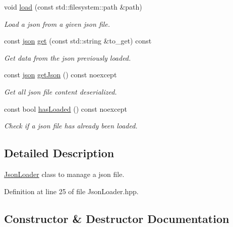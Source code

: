 \begin{DoxyCompactItemize}
void \hyperlink{classtls_1_1_json_loader_ad587735dbb8e8cfc5cd002a0aa9a7d7f}{load} (const std\+::filesystem\+::path \&path)
\begin{DoxyCompactList}\small\item\em Load a json from a given json file. \end{DoxyCompactList}\item 
const \hyperlink{namespacetls_a4e8d32383e204ee25990db65651ea712}{json} \hyperlink{classtls_1_1_json_loader_a0174b44e635a44811616c394d89b73e5}{get} (const std\+::string \&to\+\_\+get) const
\begin{DoxyCompactList}\small\item\em Get data from the json previously loaded. \end{DoxyCompactList}\item 
const \hyperlink{namespacetls_a4e8d32383e204ee25990db65651ea712}{json} \hyperlink{classtls_1_1_json_loader_aef4c88eb0589673f806e7fedf7b3b6b9}{get\+Json} () const noexcept
\begin{DoxyCompactList}\small\item\em Get all json file content deserialized. \end{DoxyCompactList}\item 
const bool \hyperlink{classtls_1_1_json_loader_ac7fa5168de0714b4ab4cf3f7f366dbdf}{has\+Loaded} () const noexcept
\begin{DoxyCompactList}\small\item\em Check if a json file has already been loaded. \end{DoxyCompactList}\end{DoxyCompactItemize}


\subsection{Detailed Description}
\hyperlink{classtls_1_1_json_loader}{Json\+Loader} class to manage a json file. 

Definition at line 25 of file Json\+Loader.\+hpp.



\subsection{Constructor \& Destructor Documentation}
\mbox{\label{classtls_1_1_json_loader_a9f9fc1f46e82b4f377b22c8acf0f3b9d}} 
